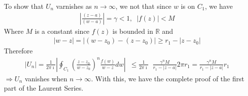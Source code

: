 \documentclass[12pt]{report}
\newcommand{\NI}{\noindent}
\newcommand{\real}{ \mathbb{R}}
\newcommand{\imaginary}{\imath}
\begin{document}
	\NI To show that $U_n$ varnishes as $n\rightarrow\infty$, we not that since $w$ is on $C_1$, we have 
	\begin{eqnarray*}
		\left|\frac{(z-a)}{(w-a)}\right| = \gamma < 1,\;\; |f(z)| < M
	\end{eqnarray*}
	Where $M$ is a constant since $f(z)$ is bounded in $\real$ and
	\begin{eqnarray*}
		|w-z| = |(w-z_0) - (z-z_0)| \geq r_1 - |z-z_0|
	\end{eqnarray*}
	Therefore
	\begin{eqnarray*}
		|U_n| = \frac{1}{2\pi\imaginary}\left|\oint_{C_1}\left(\frac{z-z_0}{w-z_0}\right)^n \frac{f(w)}{w-z}dw \right|\;\; \leq \frac{1}{2\pi\imaginary}\;\;\frac{\gamma^nM}{r_1-|z-a|}2\pi r_1 = \frac{\gamma^n M}{r_1-|z-a|}r_1
	\end{eqnarray*}
	$\Rightarrow U_n$ vanishes when $n\rightarrow\infty$. With this, we have the complete proof of the first part of the Laurent Series.\\
	
\end{document}
